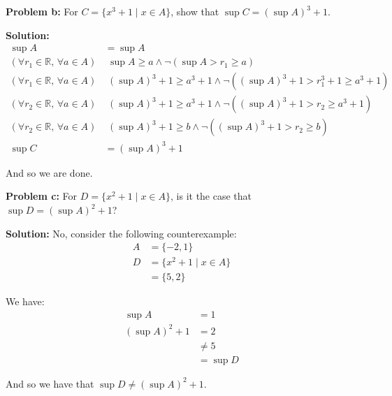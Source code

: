 \documentclass{article}
\newcommand{\R}{\mathbb R}
\begin{document}
\noindent\textbf{Problem b:} For $C=\{x^3+1\mid x\in A\}$, show that $\sup C=(\sup A)^3+1$.
\bigskip

\noindent\textbf{Solution:}
\begin{align*}
  \sup A &= \sup A\\
  (\forall r_1\in\R,\,\forall a\in A)&\,\,\sup A\ge a\wedge\neg(\sup A>r_1\ge a)\tag{def. of supremum}\\
  (\forall r_1\in\R,\,\forall a\in A)&\,\,(\sup A)^3+1\ge a^3+1\wedge\neg((\sup A)^3+1>r_1^3+1\ge a^3+1)\tag{$x^3+1$ is an increasing function}\\
  (\forall r_2\in\R,\,\forall a\in A)&\,\,(\sup A)^3+1\ge a^3+1\wedge\neg((\sup A)^3+1>r_2\ge a^3+1)\tag{$(\forall r_1\in\R,\,\exists r_2\in\R)\,\,r_2=r_1^3+1$ (see problem 2)}\\
  (\forall r_2\in\R,\,\forall a\in A)&\,\,(\sup A)^3+1\ge b\wedge\neg((\sup A)^3+1>r_2\ge b)\tag{$a\in A\iff a^3+1\in B$ (i.e. def. of $B$)}\\
  \sup C &=(\sup A)^3 + 1\tag{def. of supremum}
\end{align*}

And so we are done.
\bigskip

\noindent\textbf{Problem c:} For $D=\{x^2+1\mid x\in A\}$, is it the case that $\sup D=(\sup A)^2+1$?
\bigskip

\noindent\textbf{Solution:} No, consider the following counterexample:
\begin{align*}
  A&=\{-2,1\}\\
  D&=\{x^2+1\mid x\in A\}\\
  &=\{5,2\}
\end{align*}

We have:
\begin{align*}
  \sup A&=1\\
  (\sup A)^2+1&=2\\
  &\not=5\\
  &=\sup D
\end{align*}

And so we have that $\sup D\not=(\sup A)^2+1$.
\end{document}
